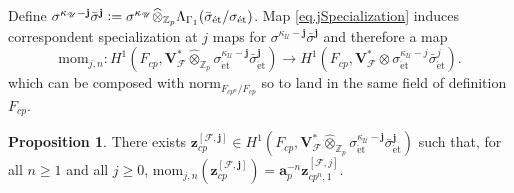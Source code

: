 \documentclass[a4paper]{amsart}
\numberwithin{equation}{section}
\theoremstyle{definition}
\newtheorem{proposition}[theorem]{Proposition}
\newcommand{\Z}{\mathbb{Z}}
\newcommand{\defeq}{\vcentcolon=}
\DeclareMathOperator{\et}{\text{\'et}}
\newcommand{\norm}{\mathrm{norm}}
\renewcommand{\et}{\mathrm{\acute{e}t}}
\begin{document}
Define $\sigma^{\kappa_{{\mathscr{U}}}-\mathbf{j}}\bar\sigma^{\mathbf{j}}\defeq\sigma^{\kappa_{{\mathscr{U}}}}\widehat\otimes_{\Z_p}\Lambda_{\Gamma_1}(\bar\sigma_{\et}/\sigma_{\et})$. Map \eqref{eq.jSpecialization} induces correspondent specialization at $j$ maps for $\sigma^{\kappa_{{\mathscr{U}}}-\mathbf{j}}\bar\sigma^{\mathbf{j}}$ and therefore a map
\begin{equation}\label{momj}
\mathrm{mom}_{j,n}\colon H^1\left(F_{cp},\mathbf{V}_{\mathscr{F}}^\ast\widehat\otimes_{\Z_p}
\sigma_{\et}^{\kappa_{{\mathscr{U}}}-\mathbf{j}}\bar\sigma_{\et}^{\mathbf{j}}
\right)\longrightarrow H^1(F_{cp},\mathbf{V}_{\mathscr{F}}^\ast\otimes\sigma_{\et}^{\kappa_{{\mathscr{U}}}-j}\bar\sigma_{\et}^j).
\end{equation}
which can be composed with $\norm_{F_{cp^n}/F_{cp}}$ so to land in the same field of definition $F_{cp}$.

\begin{proposition}\label{prop.BigHeegnerClass}
There exists
$\mathbf{z}_{cp}^{[\mathscr{F},\mathbf{j}]}\in H^1\left(F_{cp},\mathbf{V}_{\mathscr{F}}^\ast\widehat\otimes_{\Z_p}
\sigma_{\et}^{\kappa_{{\mathscr{U}}}-\mathbf{j}}\bar\sigma_{\et}^{\mathbf{j}}\right)$ 
such that, for all $n\geq 1$ and all $j\geq 0$, $\mathrm{mom}_{j,n}(\mathbf{z}_{cp}^{[\mathscr{F},\mathbf{j}]})=\mathbf{a}_p^{-n}\mathbf{z}^{[\mathscr{F},j]}_{cp^n,1}$. 
\end{proposition}
\end{document}
